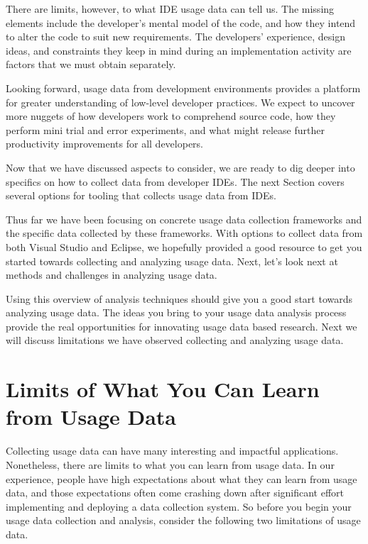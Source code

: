 \documentclass{book}
\begin{document}
There are limits, however, to what IDE usage data can tell us.  The missing elements include the developer's mental model of the code, and how they intend to alter the code to suit new requirements.  The developers' experience, design ideas, and constraints they keep in mind during an implementation activity are factors that we must obtain separately.  

Looking forward, usage data from development environments provides a platform for greater understanding of low-level developer practices.  We expect to uncover more nuggets of how developers work to comprehend source code, how they perform mini trial and error experiments, and what might release further productivity improvements for all developers.


\pagebreak






Now that we have discussed aspects to consider, we are ready to dig deeper into specifics on how to collect data from developer IDEs.  The next Section covers several options for tooling that collects usage data from IDEs.






Thus far we have been focusing on concrete usage data collection frameworks and the specific data collected by these frameworks.  With options to collect data from both Visual Studio and Eclipse, we hopefully provided a good resource to get you started towards collecting and analyzing usage data.  Next, let's look next at methods and challenges in analyzing usage data.

\newpage




Using this overview of analysis techniques should give you a good start towards analyzing usage data.
The ideas you bring to your usage data analysis process provide the real opportunities for innovating usage data based research.  Next we will discuss limitations we have observed collecting and analyzing usage data.

\section{Limits of What You Can Learn from Usage Data}
\label{sec:limitations}

Collecting usage data can have many interesting and impactful applications.
Nonetheless, there are limits to what you can learn
from usage data.
In our experience, people have
high expectations about what they can learn from usage data, and those
expectations often come crashing down after significant effort implementing
and deploying a data collection system.
So before you begin your usage data collection and analysis, consider
the following two limitations of usage data.
\end{document}
